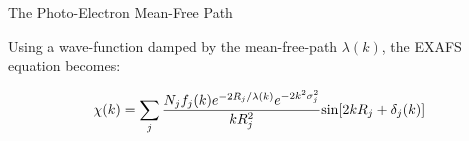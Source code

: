 
\begin{slide}{The Photo-Electron Mean-Free Path}
  \vmm


    Using a wave-function damped by the mean-free-path $\lambda(k)$, 
    the EXAFS equation becomes:
    
    \[ {\chi(k) = \sum_j {{N_j f_j(k) e^{-2R_j/\lambda(k)}
          e^{-2k^2\sigma_j^2}}\over{kR_j^2}} {\sin[{2kR_j + \delta_j(k)]
        }}
    }\]   
    
    
    \begin{center} 
      \begin{minipage}{60mm}
      \end{minipage}
    \end{center}
      
      
    \begin{center}
    \end{center}

\vfill
\end{slide} 
